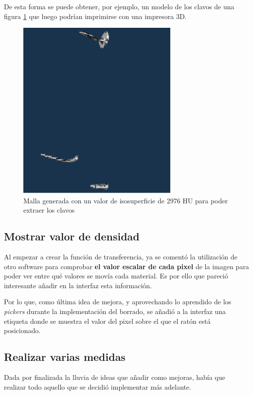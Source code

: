 De esta forma se puede obtener, por ejemplo, un modelo de los clavos de una figura \ref{fig:malla_clavos} que luego podrían imprimirse con una impresora 3D.

\begin{figure}[H]
	\centering
	\includegraphics[width=8cm]{imagenes/malla_clavos}
	\caption{Malla generada con un valor de isosuperficie de 2976 HU para poder extraer los clavos}
	\label{fig:malla_clavos}
\end{figure}

\subsection{Mostrar valor de densidad}

Al empezar a crear la función de transferencia, ya se comentó la utilización de otro software para comprobar \textbf{el valor escalar de cada pixel} de la imagen para poder ver entre qué valores se movía cada material. Es por ello que pareció interesante añadir en la interfaz esta información.

Por lo que, como última idea de mejora, y aprovechando lo aprendido de los \textit{pickers} durante la implementación del borrado, se añadió a la interfaz una etiqueta donde se muestra el valor del pixel sobre el que el ratón está posicionado.

\subsection{Realizar varias medidas}

Dada por finalizada la lluvia de ideas que añadir como mejoras, había que realizar todo aquello que se decidió implementar más adelante.

